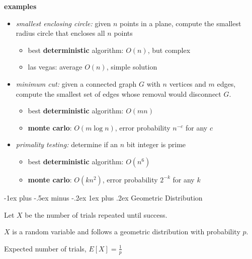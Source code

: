 \documentclass[10pt, landscape]{article}
\makeatletter
\renewcommand{\subsubsection}{\@startsection{subsubsection}{3}{0mm}%
  {-1ex plus -.5ex minus -.2ex}%
  {1ex plus .2ex}%
{\normalfont\small\bfseries}}%
\makeatother
\begin{document}
\begin{multicols*}{4}
  \textbf{examples}
  \begin{itemize}
    \item \textit{smallest enclosing circle:} given $n$ points in a plane, compute the smallest radius circle that encloses all $n$ points
      \begin{itemize}
        \item best \textbf{deterministic} algorithm: $O(n)$, but complex
        \item las vegas: average $O(n) $, simple solution
      \end{itemize}
    \item \textit{minimum cut:} given a connected graph $G$ with $n$ vertices and $m$ edges, compute the smallest set of edges whose removal would disconnect $G$.
      \begin{itemize}
        \item best \textbf{deterministic} algorithm: $O(mn)$
        \item \textbf{monte carlo}: $O(m \log n) $, error probability $n^{-c}$ for any $c$
      \end{itemize}
    \item \textit{primality testing:} determine if an $n$ bit integer is prime
      \begin{itemize}
        \item best \textbf{deterministic} algorithm: $O(n^6)$
        \item \textbf{monte carlo}: $O(kn^2)$, error probability $2^{-k}$ for any $k$
      \end{itemize}
  \end{itemize}

  \subsubsection{Geometric Distribution}

  Let $X$ be the number of trials repeated until success. 

  $X$ is a random variable and follows a geometric distribution with probability $p$.

  Expected number of trials, $E[X] = \frac{1}{p} $























\end{multicols*}
\end{document}
